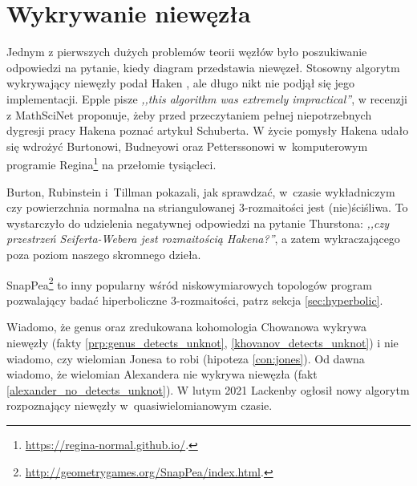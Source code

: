 
\section{Wykrywanie niewęzła}
Jednym z pierwszych dużych problemów teorii węzłów było poszukiwanie odpowiedzi na pytanie, kiedy diagram przedstawia niewęzeł.
%
Stosowny algorytm wykrywający niewęzły podał Haken \cite{haken1961}, ale długo nikt nie podjął się jego implementacji.
%
Epple pisze \emph{,,this algorithm was extremely impractical''}, w recenzji z MathSciNet proponuje, żeby przed przeczytaniem pełnej niepotrzebnych dygresji pracy Hakena poznać artykuł \cite{schubert1961} Schuberta.
%
%
W życie pomysły Hakena udało się wdrożyć Burtonowi, Budneyowi oraz Petterssonowi w~komputerowym programie Regina\footnote{\url{https://regina-normal.github.io/}.} na przełomie tysiącleci.

%
%
%

Burton, Rubinstein i~Tillman \cite{burton2012} pokazali, jak sprawdzać, w~czasie wykładniczym czy powierzchnia normalna na striangulowanej 3-rozmaitości jest (nie)ściśliwa.
%
%
To wystarczyło do udzielenia negatywnej odpowiedzi na pytanie Thurstona: \emph{,,czy przestrzeń Seiferta-Webera jest rozmaitością Hakena?''}, a zatem wykraczającego poza poziom naszego skromnego dzieła.
%
%
%

SnapPea\footnote{\url{http://geometrygames.org/SnapPea/index.html}.} to inny popularny wśród niskowymiarowych topologów program pozwalający badać hiperboliczne 3-rozmaitości, patrz sekcja \ref{sec:hyperbolic}.

Wiadomo, że genus oraz zredukowana kohomologia Chowanowa wykrywa niewęzły (fakty \ref{prp:genus_detects_unknot}, \ref{khovanov_detects_unknot}) i nie wiadomo, czy wielomian Jonesa to robi (hipoteza \ref{con:jones}).
%
%
%
Od dawna wiadomo, że wielomian Alexandera nie wykrywa niewęzła (fakt \ref{alexander_no_detects_unknot}).
%
W lutym 2021 Lackenby ogłosił nowy algorytm rozpoznający niewęzły w~quasiwielomianowym czasie.
%


